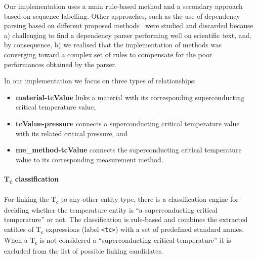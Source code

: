 \documentclass{article}
\begin{document}
Our implementation uses a main rule-based method and a secondary approach based on sequence labelling. Other approaches, such as the use of dependency parsing based on different proposed methods~\cite{yoshikawa:2017acl, Tiktinsky2020pyBARTES, swayamdipta:17, zhou-zhao-2019-head} were studied and discarded because a) challenging to find a dependency parser performing well on scientific text, and, by consequence, b) we realised that the implementation of methods was converging toward a complex set of rules to compensate for the poor performances obtained by the parser.

In our implementation we focus on three types of relationships: 
\begin{itemize}
    \item \textbf{material-tcValue} links a material with its corresponding superconducting critical temperature value, 
    \item \textbf{tcValue-pressure} connects a superconducting critical temperature value with its related critical pressure, and 
    \item \textbf{me\_method-tcValue} connects the superconducting critical temperature value to its corresponding measurement method.
\end{itemize}

\paragraph{T\textsubscript{c} classification}
For linking the T\textsubscript{c} to any other entity type, there is a classification engine for deciding whether the temperature entity is  ``a superconducting critical temperature'' or not. 
The classification is rule-based and combines the extracted entities of T\textsubscript{c} expressions (label \texttt{<tc>}) with a set of predefined standard names. 
When a T\textsubscript{c} is not considered a ``superconducting critical temperature'' it is excluded from the list of possible linking candidates. 
\end{document}
